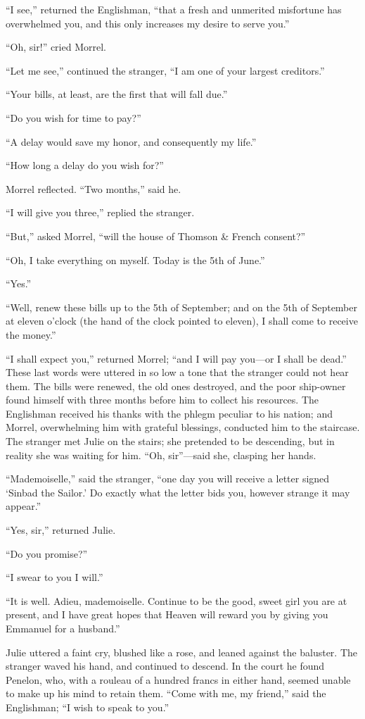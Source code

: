 “I see,” returned the Englishman, “that a fresh and unmerited
misfortune has overwhelmed you, and this only increases my desire to
serve you.”

“Oh, sir!” cried Morrel.

“Let me see,” continued the stranger, “I am one of your largest
creditors.”

“Your bills, at least, are the first that will fall due.”

“Do you wish for time to pay?”

“A delay would save my honor, and consequently my life.”

“How long a delay do you wish for?”

Morrel reflected. “Two months,” said he.

“I will give you three,” replied the stranger.

“But,” asked Morrel, “will the house of Thomson \& French consent?”

“Oh, I take everything on myself. Today is the 5th of June.”

“Yes.”

“Well, renew these bills up to the 5th of September; and on the 5th of
September at eleven o’clock (the hand of the clock pointed to eleven),
I shall come to receive the money.”

“I shall expect you,” returned Morrel; “and I will pay you—or I shall
be dead.” These last words were uttered in so low a tone that the
stranger could not hear them. The bills were renewed, the old ones
destroyed, and the poor ship-owner found himself with three months
before him to collect his resources. The Englishman received his thanks
with the phlegm peculiar to his nation; and Morrel, overwhelming him
with grateful blessings, conducted him to the staircase. The stranger
met Julie on the stairs; she pretended to be descending, but in reality
she was waiting for him. “Oh, sir”—said she, clasping her hands.

“Mademoiselle,” said the stranger, “one day you will receive a letter
signed ‘Sinbad the Sailor.’ Do exactly what the letter bids you,
however strange it may appear.”

“Yes, sir,” returned Julie.

“Do you promise?”

“I swear to you I will.”

“It is well. Adieu, mademoiselle. Continue to be the good, sweet girl
you are at present, and I have great hopes that Heaven will reward you
by giving you Emmanuel for a husband.”

Julie uttered a faint cry, blushed like a rose, and leaned against the
baluster. The stranger waved his hand, and continued to descend. In the
court he found Penelon, who, with a rouleau of a hundred francs in
either hand, seemed unable to make up his mind to retain them. “Come
with me, my friend,” said the Englishman; “I wish to speak to you.”
